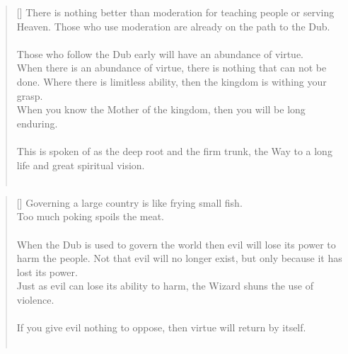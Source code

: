 \documentclass{article}
\begin{document}
\settowidth{\versewidth}{The Wizard leads byemptying people’s minds, filling their bellies, weakening their am- bitions, and making them become strong}
\begin{verse}[\versewidth]
There is nothing better than moderation for teaching people or serving Heaven. 
Those who use moderation are already on the path to the Dub.\\
\hfill\\
Those who follow the Dub early will have an abundance of virtue.\\
When there is an abundance of virtue, there is nothing that can not be done. 
Where there is limitless ability, then the kingdom is withing your grasp.\\
When you know the Mother of the kingdom, then you will be long enduring.\\
\hfill\\
This is spoken of as the deep root and the firm trunk, the Way to a long life and great spiritual vision.\\
\hfill\\
\end{verse}

\settowidth{\versewidth}{The Wizard leads byemptying people’s minds, filling their bellies, weakening their am- bitions, and making them become strong}
\begin{verse}[\versewidth]
Governing a large country is like frying small fish.\\
Too much poking spoils the meat.\\
\hfill\\
When the Dub is used to govern the world then evil will lose its power to harm the people. 
Not that evil will no longer exist, but only because it has lost its power.\\
Just as evil can lose its ability to harm, the Wizard shuns the use of violence.\\
\hfill\\
If you give evil nothing to oppose, then virtue will return by itself.\\
\hfill\\
\end{verse}
\end{document}
